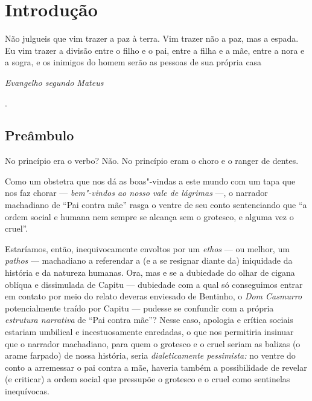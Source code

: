 
\chapter*{Introdução}


\epigraph{Não julgueis que vim trazer a paz à terra. Vim trazer não a paz, mas a
espada. Eu vim trazer a divisão entre o filho e o pai, entre a filha e a
mãe, entre a nora e a sogra, e os inimigos do homem serão as pessoas de
sua própria casa}{\emph{Evangelho segundo Mateus\footnotemark}}
.

\section{Preâmbulo}

\noindent No princípio era o verbo? Não. No princípio eram o choro e o ranger de
dentes.

Como um obstetra que nos dá as boas"-vindas a este mundo com um tapa que
nos faz chorar --- \emph{bem"-vindos ao nosso vale de lágrimas} ---, o
narrador machadiano de ``Pai contra mãe'' rasga o ventre de seu conto
sentenciando que ``a ordem social e humana nem sempre se alcança sem o
grotesco, e alguma vez o cruel''.

Estaríamos, então, inequivocamente envoltos por um \emph{ethos} --- ou
melhor, um \emph{pathos} --- machadiano a referendar a (e a se resignar
diante da) iniquidade da história e da natureza humanas. Ora, mas e se a
dubiedade do olhar de cigana oblíqua e dissimulada de Capitu ---
dubiedade com a qual só conseguimos entrar em contato por meio do relato
deveras enviesado de Bentinho, o \emph{Dom Casmurro} potencialmente
traído por Capitu --- pudesse se confundir com a própria \emph{estrutura
narrativa} de ``Pai contra mãe''? Nesse caso, apologia e crítica sociais
estariam umbilical e incestuosamente enredadas, o que nos permitiria
insinuar que o narrador machadiano, para quem o grotesco e o cruel
seriam as balizas (o arame farpado) de nossa história, seria
\emph{dialeticamente pessimista:} no ventre do conto a arremessar o pai
contra a mãe, haveria também a possibilidade de revelar (e criticar) a
ordem social que pressupõe o grotesco e o cruel como sentinelas
inequívocas.

